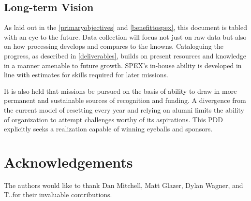 \documentclass[conference]{IEEEtran} %
\begin{document}
\subsection{Long-term Vision}
As laid out in the \autoref{primaryobjectives} and \autoref{benefittospex}, this document is tabled with an eye to the future. Data collection will focus not just on raw data but also on how processing develops and compares to the knowns. 
Cataloguing the progress, as described in \autoref{deliverables}, builds on present resources and knowledge in a manner amenable to future growth. 
SPEX's in-house ability is developed in line with estimates for skills required for later missions. 

It is also held that missions be pursued on the basis of ability to draw in more permanent and sustainable sources of recognition and funding. 
A divergence from the current model of resetting every year and relying on alumni limits the ability of organization to attempt challenges worthy of its aspirations. 
This PDD explicitly seeks a realization capable of winning eyeballs and sponsors.

\section*{Acknowledgements}
The authors would like to thank Dan Mitchell, Matt Glazer, Dylan Wagner, and T.\@J.\@Tarazevits for their invaluable contributions. 




\onecolumn
\appendices{}
\end{document}
